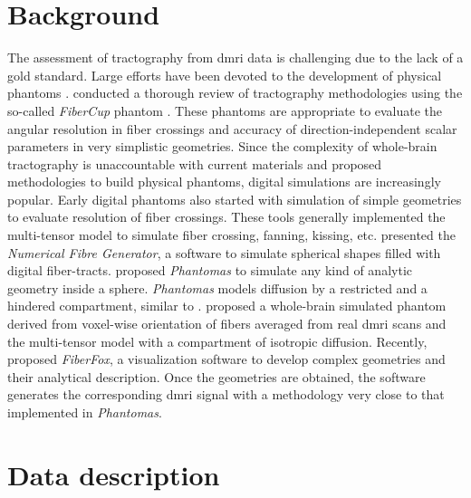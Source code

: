 \documentclass[english]{frontiers/frontiersSCNS} %
\begin{document}
\section*{Background}
The assessment of tractography from \gls*{dmri} data is challenging due to
  the lack of a gold standard.
Large efforts have been devoted to the development of physical phantoms
  \citep{lin_validation_2001,campbell_flowbased_2005,perrin_validation_2005,fieremans_simulation_2008,tournier_resolving_2008}.
\cite{cote_tractometer_2013} conducted a thorough review of tractography methodologies using the
  so-called \emph{FiberCup} phantom \citep{poupon_new_2008,fillard_quantitative_2011}.
These phantoms are appropriate to evaluate the angular resolution in fiber crossings and accuracy of
  direction-independent scalar parameters in very simplistic geometries.
Since the complexity of whole-brain tractography is unaccountable with current materials and proposed
  methodologies to build physical phantoms, digital simulations are increasingly popular.
Early digital phantoms also started with simulation of simple geometries
  \citep{basser_in_2000,goessl_fiber_2002,tournier_limitations_2002,leemans_mathematical_2005}
  to evaluate resolution of fiber crossings.
These tools generally implemented the multi-tensor model \citep{alexander_analysis_2001,tuch_high_2002}
  to simulate fiber crossing, fanning, kissing, etc.
\cite{close_software_2009} presented the \emph{Numerical Fibre Generator}, a software to simulate
  spherical shapes filled with digital fiber-tracts.
\cite{caruyer_Phantomas_2014} proposed \emph{Phantomas} to simulate any kind of analytic geometry
  inside a sphere.
\emph{Phantomas} models diffusion by a restricted and a hindered compartment, similar to
  \citep{assaf_composite_2005}.
\cite{wilkins_fiber_2014} proposed a whole-brain simulated phantom derived from voxel-wise orientation
  of fibers averaged from real \gls*{dmri} scans and the multi-tensor model with a compartment of
  isotropic diffusion.
Recently, \cite{neher_fiberfox_2014} proposed \emph{FiberFox}, a visualization software to develop
  complex geometries and their analytical description.
Once the geometries are obtained, the software generates the corresponding \gls*{dmri} signal with a
  methodology very close to that implemented in \emph{Phantomas}.


\section*{Data description}
\end{document}
